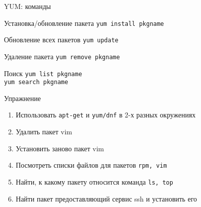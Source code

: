 \begin{frame}{YUM: команды}
	\begin{block}{Установка/обновление пакета}
		{\tt yum install pkgname }
	\end{block}
	\begin{block}{Обновление всех пакетов}
		{\tt yum update }
	\end{block}
	\begin{block}{Удаление пакета}
		{\tt yum remove pkgname }
	\end{block}
	\begin{block}{Поиск}
		{\tt yum list pkgname }\\
		{\tt yum search pkgname }
	\end{block}
\end{frame}


\begin{frame}[fragile]{Упражнение}
  \begin{enumerate}
      \item Использовать {\tt apt-get} и {\tt yum/dnf} в 2-х разных окружениях
      \item Удалить пакет vim
      \item Установить заново пакет vim
      \item Посмотреть списки файлов для пакетов {\tt rpm, vim}
      \item Найти, к какому пакету относится команда {\tt ls, top}
      \item Найти пакет предоставляющий сервис ssh и установить его
    \end{enumerate}
\end{frame}


